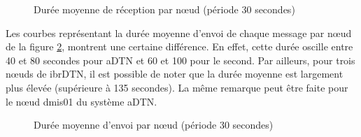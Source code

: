 \documentclass[a4paper,10pt]{article}
\begin{document}
\begin{figure}[h!]
    \centering
    \caption{Durée moyenne de réception par nœud (période 30 secondes)}
    \label{fig:30_avg_rcv_duration}
\end{figure}

Les courbes représentant la durée moyenne d’envoi de chaque message par nœud de la figure \ref{fig:30_avg_snd_duration}, montrent une certaine différence. En effet, cette durée oscille entre 40 et 80 secondes pour aDTN et 60 et 100 pour le second. Par ailleurs, pour trois nœuds de ibrDTN, il est possible de noter que la durée moyenne est largement plus élevée (supérieure à 135 secondes). La même remarque peut être faite pour le nœud dmis01 du système aDTN.\par

\begin{figure}[h!]
    \centering
    \caption{Durée moyenne d'envoi par nœud (période 30 secondes)}
    \label{fig:30_avg_snd_duration}
\end{figure}
\end{document}
